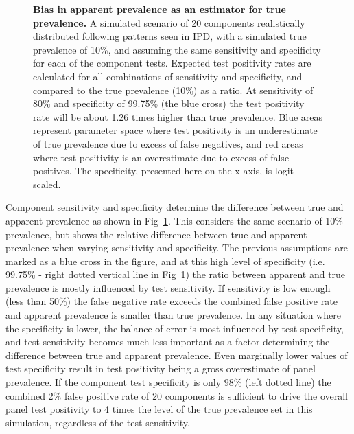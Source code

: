 \documentclass[10pt,letterpaper]{article}
\begin{document}
\begin{figure}[ht!]
\caption{{\bf Bias in apparent prevalence as an estimator for true prevalence.}
A simulated scenario of 20 components realistically distributed following patterns seen in IPD, with a simulated true prevalence of 10\%, and assuming the same sensitivity and specificity for each of the component tests. Expected test positivity rates are calculated for all combinations of sensitivity and specificity, and compared to the true prevalence (10\%) as a ratio. At sensitivity of 80\% and specificity of 99.75\% (the blue cross) the test positivity rate will be about 1.26 times higher than true prevalence. Blue areas represent parameter space where test positivity is an underestimate of true prevalence due to excess of false negatives, and red areas where test positivity is an overestimate due to excess of false positives. The specificity, presented here on the x-axis, is logit scaled.}
\label{fig4}
\end{figure}

Component sensitivity and specificity determine the difference between true and apparent prevalence as shown in Fig~\ref{fig4}.  This considers the same scenario of 10\% prevalence, but shows the relative difference between true and apparent prevalence when varying sensitivity and specificity. The previous assumptions are marked as a blue cross in the figure, and at this high level of specificity (i.e. 99.75\% - right dotted vertical line in Fig~\ref{fig4}) the ratio between apparent and true prevalence is mostly influenced by test sensitivity. If sensitivity is low enough (less than 50\%) the false negative rate exceeds the combined false positive rate and apparent prevalence is smaller than true prevalence. In any situation where the specificity is lower, the balance of error is most influenced by test specificity, and test sensitivity becomes much less important as a factor determining the difference between true and apparent prevalence. Even marginally lower values of test specificity result in test positivity being a gross overestimate of panel prevalence. If the component test specificity is only 98\% (left dotted line) the combined 2\% false positive rate of 20 components is sufficient to drive the overall panel test positivity to 4 times the level of the true prevalence set in this simulation, regardless of the test sensitivity.
\end{document}
